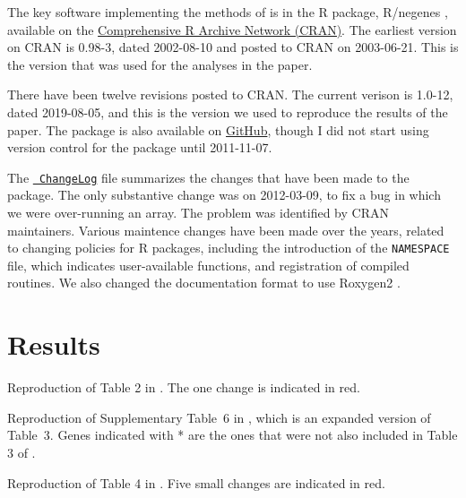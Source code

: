 The key software implementing the methods of \citet{lamichhane2003}
is in the R package, R/negenes \citep{negenes}, available on the
\href{https://cran.r-project.org/package=negenes}{Comprehensive R
Archive Network (CRAN)}. The earliest version on CRAN is 0.98-3, dated
2002-08-10 and posted to CRAN on 2003-06-21. This is the version that
was used for the analyses in the paper.

There have been twelve revisions posted to CRAN. The current verison
is 1.0-12, dated 2019-08-05, and this is the version we used to
reproduce the results of the paper. The package is also available on
\href{https://github.com/kbroman/negenes}{GitHub}, though I did not
start using version control for the package until 2011-11-07.

The \href{https://github.com/kbroman/negenes/blob/master/ChangeLog}{\tt
ChangeLog} file summarizes the changes that have been made to the
package. The only substantive change was on 2012-03-09, to fix a bug
in which we were over-running an array. The problem was identified by
CRAN maintainers. Various maintence changes have been made over the
years, related to changing policies for R packages, including the
introduction of the {\tt NAMESPACE} file, which indicates
user-available functions, and registration of compiled routines. We
also changed the documentation format to use
Roxygen2 \citep{roxygen2}.


\section{Results}


\begin{table}
\caption{Reproduction of Table 2 in \citet{lamichhane2003}. The one
change is indicated in red.\label{tab:tab2}}

\centering

\end{table}



\begin{table}
\caption{Reproduction of Supplementary Table~6 in \citet{lamichhane2003}, which
is an expanded version of Table~3.
Genes indicated with * are the ones that were not also included in
Table 3 of \citet{lamichhane2003}.\label{tab:tab6}}

\centering

\end{table}




\begin{table}
\caption{Reproduction of Table 4 in \citet{lamichhane2003}. Five
small changes are indicated in red.\label{tab:tab4}}

\centering
\small

\end{table}




